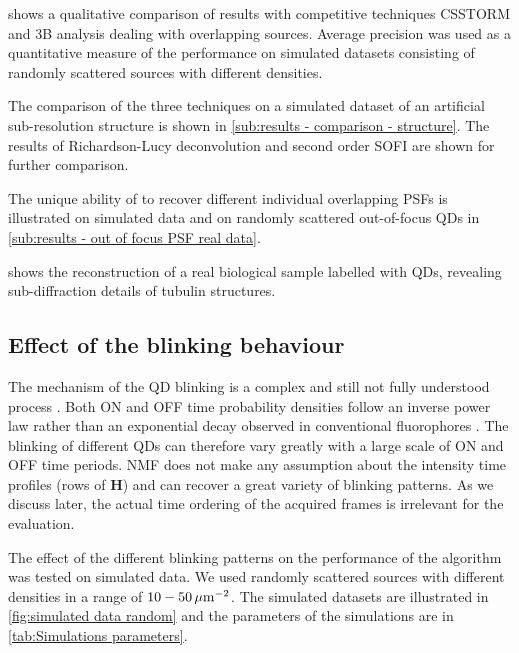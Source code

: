  shows a qualitative comparison of \inmf{} results with competitive techniques CSSTORM and 3B analysis dealing with overlapping sources. Average precision was used as a quantitative measure of the performance on simulated datasets consisting of randomly scattered sources with different densities.

The comparison of the three techniques on a simulated dataset of an artificial sub-resolution structure is shown in \autoref{sub:results - comparison - structure}. The results of Richardson-Lucy deconvolution and second order SOFI are shown for further comparison. 

The unique ability of \inmf{} to recover different individual overlapping PSFs is illustrated on simulated data and on randomly scattered out-of-focus QDs in \autoref{sub:results - out of focus PSF real data}.

 shows the \inmf{} reconstruction of a real biological sample labelled with QDs, revealing sub-diffraction details of tubulin structures.


\subsection{Effect of the blinking behaviour \label{sub:results - blinking behaviour}}
The mechanism of the QD blinking is a complex and still not fully understood process \cite{Stefani2009}. Both ON and OFF time probability densities follow an inverse power law rather than an exponential decay observed in conventional fluorophores \cite{Kuno2001}. The blinking of different QDs can therefore vary greatly with a large scale of ON and OFF time periods. NMF does not make any assumption about the intensity time profiles (rows of $\bm{H}$) and can recover a great variety of blinking patterns. As we discuss later, the actual time ordering of the acquired frames is irrelevant for the \inmf{} evaluation. 

The effect of the different blinking patterns on the performance of the \inmf{} algorithm was tested on simulated data. We used randomly scattered sources with different densities in a range of $10-50\, \mathrm{\mu m}^{-2}$. The simulated datasets are illustrated in \autoref{fig:simulated data random} and the parameters of the simulations are in \autoref{tab:Simulations parameters}. 

